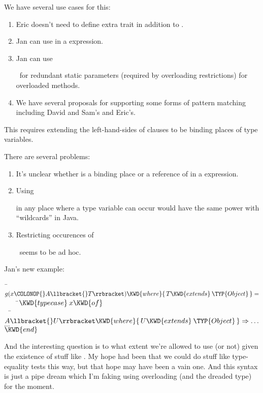 \begin{itemize}
We have several use cases for this:
 \begin{enumerate}
 \item Eric doesn't need to define extra trait  in addition to
        .
 \item Jan can use  in a
      expression.
 \item Jan can use \ignore\ for redundant static parameters (required by
     overloading restrictions) for overloaded methods.
 \item We have several proposals for supporting some forms of pattern
        matching including David and Sam's and Eric's.
 \end{enumerate}

   This requires extending the left-hand-sides of  clauses to
   be binding places of type variables.

   There are several problems:
 \begin{enumerate}
     \item It's unclear whether
      is a binding place or
     a     reference        of  in a  expression.
     \item Using \ignore in any place where a type variable can occur would
        have
        the same power with ``wildcards'' in Java.
     \item Restricting occurences of \ignore\ seems to be ad hoc.
 \end{enumerate}

Jan's new example:

\begin{Fortress}
{\tt~}\pushtabs\=\+\( g(x\COLONOP{}A\llbracket{}T\rrbracket) \KWD{where} \{\,T \KWD{extends}\:\TYP{Object}\,\} =\)\\
{\tt~~~~}\pushtabs\=\+\(     \KWD{typecase}\:x \KWD{of}\)\\
{\tt~~}\pushtabs\=\+\(       A\llbracket{}U\rrbracket \KWD{where} \{\,U \KWD{extends}\:\TYP{Object}\,\} \Rightarrow \ldots\)\\
\(       \ldots\)\-\\\poptabs
\(     \KWD{end}\)\-\-\\\poptabs\poptabs
\end{Fortress}
And the interesting question is to what extent we're allowed to use 
(or not) given the existence of stuff like .
My hope had been that we could do stuff like type-equality tests this way,
but that hope may have been a vain one.  And this syntax is just a pipe dream
which I'm faking using overloading (and the dreaded  type)
for the moment.


\end{itemize}
